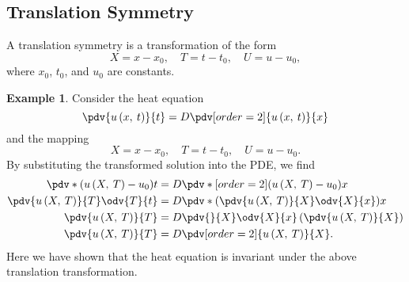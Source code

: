 \documentclass{article}
\theoremstyle{definition}
\newtheorem{example}{Example}[section]
\begin{document}
\subsection{Translation Symmetry}
A translation symmetry is a transformation of the form
\begin{equation*}
    X = x - x_0, \quad T = t - t_0, \quad U = u - u_0,
\end{equation*}
where \(x_0\), \(t_0\), and \(u_0\) are constants.
\begin{example}
    Consider the heat equation
    \begin{equation*}
        \pdv{u\left( x,\: t \right)}{t} = D \pdv[order=2]{u\left( x,\: t \right)}{x}
    \end{equation*}
    and the mapping
    \begin{equation*}
        X = x - x_0, \quad T = t - t_0, \quad U = u - u_0.
    \end{equation*}
    By substituting the transformed solution into the PDE, we find
    \begin{align*}
        \pdv*{\left( u\left( X,\: T \right) - u_0 \right)}{t} & = D \pdv*[order=2]{\left( u\left( X,\: T \right) - u_0 \right)}{x}      \\
        \pdv{u\left( X,\: T \right)}{T} \odv{T}{t}            & = D \pdv*{\left( \pdv{u\left( X,\: T \right)}{X} \odv{X}{x} \right)}{x} \\
        \pdv{u\left( X,\: T \right)}{T}                       & = D \pdv{}{X} \odv{X}{x} \left( \pdv{u\left( X,\: T \right)}{X} \right) \\
        \pdv{u\left( X,\: T \right)}{T}                       & = D \pdv[order=2]{u\left( X,\: T \right)}{X}.
    \end{align*}
    Here we have shown that the heat equation is invariant under the
    above translation transformation.
\end{example}
\end{document}
